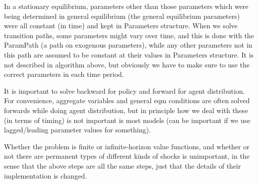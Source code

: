 \documentclass[11pt,fleqn]{article}
\begin{document}
In a stationary equilibrium, parameters other than those parameters which were being determined in general equilibrium (the general equilibrium parameters) were all constant (in time) and kept in Parameters structure. When we solve transition paths, some parameters might vary over time, and this is done with the ParamPath (a path on exogenous parameters), while any other parameters not in this path are assumed to be constant at their values in Parameters structure. It is not described in algorithm above, but obviously we have to make sure to use the correct parameters in each time period.

It is important to solve backward for policy and forward for agent distribution. For convenience, aggregate variables and general eqm conditions are often solved forwards while doing agent distribution, but in principle how we deal with these (in terms of timing) is not important is most models (can be important if we use lagged/leading parameter values for something).

Whether the problem is finite or infinite-horizon value functions, and whether or not there are permanent types of different kinds of shocks is unimportant, in the sense that the above steps are all the same steps, just that the details of their implementation is changed.



\nocite{VFIToolkit}


\end{document}
